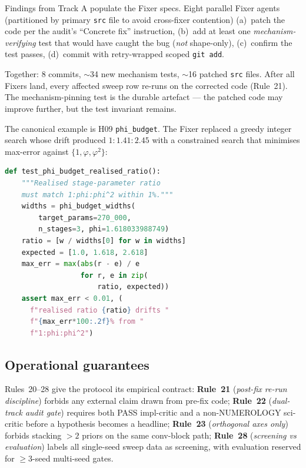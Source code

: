 \documentclass{article}
\begin{document}
Findings from Track A populate the Fixer specs. Eight parallel Fixer
agents (partitioned by primary \texttt{src} file to avoid
cross-fixer contention) (a)~patch the code per the audit's ``Concrete
fix'' instruction, (b)~add at least one
\emph{mechanism-verifying} test that would have caught the bug
(\emph{not} shape-only), (c)~confirm the test passes, (d)~commit with
retry-wrapped scoped \texttt{git add}.

Together: 8 commits, $\sim$34 new mechanism tests, $\sim$16 patched
\texttt{src} files. After all Fixers land, every affected sweep row
re-runs on the corrected code (Rule~21). The mechanism-pinning test
is the durable artefact --- the patched code may improve further, but
the test invariant remains.

The canonical example is H09 \texttt{phi\_budget}. The Fixer replaced
a greedy integer search whose drift produced $1{:}1.41{:}2.45$ with a
constrained search that minimises max-error against
$\{1, \varphi, \varphi^2\}$:

\begin{lstlisting}[language=Python, caption={Fixer-PhiScaling mechanism-pinning test (\texttt{tests/test\_phi\_budget.py}, abbreviated). The test would have caught the original 12.6\,\% drift.}, label={lst:phi-test}]
def test_phi_budget_realised_ratio():
    """Realised stage-parameter ratio
    must match 1:phi:phi^2 within 1%."""
    widths = phi_budget_widths(
        target_params=270_000,
        n_stages=3, phi=1.618033988749)
    ratio = [w / widths[0] for w in widths]
    expected = [1.0, 1.618, 2.618]
    max_err = max(abs(r - e) / e
                  for r, e in zip(
                      ratio, expected))
    assert max_err < 0.01, (
      f"realised ratio {ratio} drifts "
      f"{max_err*100:.2f}% from "
      f"1:phi:phi^2")
\end{lstlisting}

\subsection{Operational guarantees}
\label{sec:rules-summary}

Rules~20--28 give the protocol its empirical contract:
\textbf{Rule~21} (\emph{post-fix re-run discipline}) forbids any
external claim drawn from pre-fix code; \textbf{Rule~22} (\emph{dual-track
audit gate}) requires both PASS impl-critic and a non-NUMEROLOGY
sci-critic before a hypothesis becomes a headline; \textbf{Rule~23}
(\emph{orthogonal axes only}) forbids stacking $> 2$ priors on the same
conv-block path; \textbf{Rule~28} (\emph{screening vs evaluation})
labels all single-seed sweep data as screening, with evaluation
reserved for $\geq 3$-seed multi-seed gates.
\end{document}
